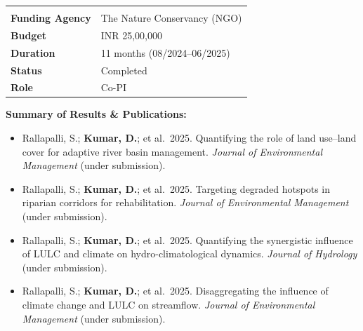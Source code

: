 \documentclass[10pt, a4paper]{article}
\begin{document}
\renewcommand{\arraystretch}{1.35}
\begin{tabularx}{\linewidth}{L{4.0cm} X}
   \\
  \textbf{Funding Agency}      & The Nature Conservancy (NGO) \\
  \textbf{Budget}              & INR 25,00,000 \\
  \textbf{Duration}            & 11 months (08/2024--06/2025) \\
  \textbf{Status}              & Completed \\
  \textbf{Role}                & Co-PI \\
\end{tabularx}

\vspace{0.3em}
\textbf{\color{AccentBlue}Summary of Results \& Publications:}
\begin{itemize}
  \item Rallapalli, S.; \textbf{Kumar, D.}; et al.\ 2025. Quantifying the role of land use--land cover for adaptive river basin management. \textit{Journal of Environmental Management} (under submission).
  \item Rallapalli, S.; \textbf{Kumar, D.}; et al.\ 2025. Targeting degraded hotspots in riparian corridors for rehabilitation. \textit{Journal of Environmental Management} (under submission).
  \item Rallapalli, S.; \textbf{Kumar, D.}; et al.\ 2025. Quantifying the synergistic influence of LULC and climate on hydro-climatological dynamics. \textit{Journal of Hydrology} (under submission).
  \item Rallapalli, S.; \textbf{Kumar, D.}; et al.\ 2025. Disaggregating the influence of climate change and LULC on streamflow. \textit{Journal of Environmental Management} (under submission).
\end{itemize}

\vspace{0.8em}
\end{document}
